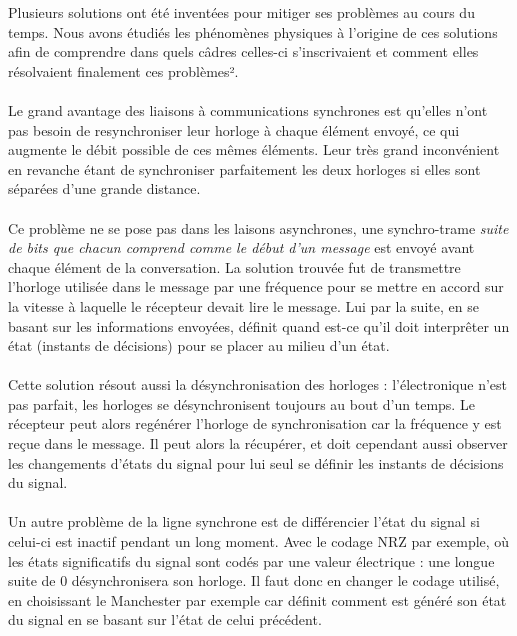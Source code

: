 Plusieurs solutions ont été inventées pour mitiger ses problèmes au cours du temps. Nous avons étudiés les phénomènes physiques à l'origine de ces solutions afin de comprendre dans quels câdres celles-ci s'inscrivaient et comment elles résolvaient finalement ces problèmes².
\\ \\
Le grand avantage des liaisons à communications synchrones est qu'elles n'ont pas besoin de resynchroniser leur horloge à chaque élément envoyé, ce qui augmente le débit possible de ces mêmes éléments. Leur très grand inconvénient en revanche étant de synchroniser parfaitement les deux horloges si elles sont séparées d'une grande distance.
\\ \\
Ce problème ne se pose pas dans les laisons asynchrones, une synchro-trame \textit{suite de bits que chacun comprend comme le début d'un message} est envoyé avant chaque élément de la conversation. La solution trouvée fut de transmettre l'horloge utilisée dans le message par une fréquence pour se mettre en accord sur la vitesse à laquelle le récepteur devait lire le message. Lui par la suite, en se basant sur les informations envoyées, définit quand est-ce qu'il doit interprêter un état (instants de décisions) pour se placer au milieu d'un état.
\\ \\
Cette solution résout aussi la désynchronisation des horloges : l'électronique n'est pas parfait, les horloges se désynchronisent toujours au bout d'un temps. Le récepteur peut alors regénérer l'horloge de synchronisation car la fréquence y est reçue dans le message. Il peut alors la récupérer, et doit cependant aussi observer les changements d'états du signal pour lui seul se définir les instants de décisions du signal.
\\ \\
Un autre problème de la ligne synchrone est de différencier l'état du signal si celui-ci est inactif pendant un long moment. Avec le codage NRZ par exemple, où les états significatifs du signal sont codés par une valeur électrique : une longue suite de 0 désynchronisera son horloge. Il faut donc en changer le codage utilisé, en choisissant le Manchester par exemple car définit comment est généré son état du signal en se basant sur l'état de celui précédent.